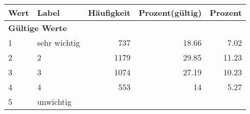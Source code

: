      \begin{longtable}{lXrrr}
     \toprule
     \textbf{Wert} & \textbf{Label} & \textbf{Häufigkeit} & \textbf{Prozent(gültig)} & \textbf{Prozent} \\
     \endhead
     \midrule
     \multicolumn{5}{l}{\textbf{Gültige Werte}}\\

     1 &
     \multicolumn{1}{X}{ sehr wichtig   } &


       \num{737} &
       \num[round-mode=places,round-precision=2]{18.66} &
         \num[round-mode=places,round-precision=2]{7.02} \\

     2 &
     \multicolumn{1}{X}{ 2   } &


       \num{1179} &
       \num[round-mode=places,round-precision=2]{29.85} &
         \num[round-mode=places,round-precision=2]{11.23} \\

     3 &
     \multicolumn{1}{X}{ 3   } &


       \num{1074} &
       \num[round-mode=places,round-precision=2]{27.19} &
         \num[round-mode=places,round-precision=2]{10.23} \\

     4 &
     \multicolumn{1}{X}{ 4   } &


       \num{553} &
       \num[round-mode=places,round-precision=2]{14} &
         \num[round-mode=places,round-precision=2]{5.27} \\

     5 &
     \multicolumn{1}{X}{ unwichtig   } &



\end{longtable}
